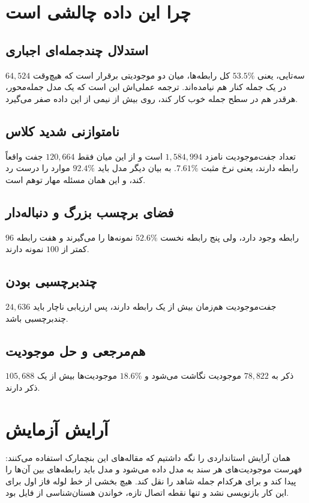 \section{چرا این داده چالشی است}
\label{sec:why-hard}

\subsection{استدلال چندجمله‌ای اجباری}
$64{,}524$ سه‌تایی، یعنی $53.5\%$ کل رابطه‌ها، میان دو موجودیتی برقرار است که هیچ‌وقت در یک جمله کنار هم نیامده‌اند. ترجمه عملی‌اش این است که یک مدل جمله‌محور، هرقدر هم در سطح جمله خوب کار کند، روی بیش از نیمی از این داده صفر می‌گیرد.

\subsection{نامتوازنی شدید کلاس}
تعداد جفت‌موجودیت نامزد $1{,}584{,}994$ است و از این میان فقط $120{,}664$ جفت واقعاً رابطه دارند، یعنی نرخ مثبت $7.61\%$. به بیان دیگر مدل باید $92.4\%$ موارد را درست رد کند، و این همان مسئله مهار توهم است.

\subsection{فضای برچسب بزرگ و دنباله‌دار}
$96$ رابطه وجود دارد، ولی پنج رابطه نخست $52.6\%$ نمونه‌ها را می‌گیرند و هفت رابطه کمتر از $100$ نمونه دارند.

\subsection{چندبرچسبی بودن}
$24{,}636$ جفت‌موجودیت هم‌زمان بیش از یک رابطه دارند، پس ارزیابی ناچار باید چندبرچسبی باشد.

\subsection{هم‌مرجعی و حل موجودیت}
$105{,}688$ ذکر به $78{,}822$ موجودیت نگاشت می‌شود و $18.6\%$ موجودیت‌ها بیش از یک ذکر دارند.

\section{آرایش آزمایش}
\label{sec:setup}

همان آرایش استانداردی را نگه داشتیم که مقاله‌های این بنچمارک استفاده می‌کنند: فهرست موجودیت‌های هر سند به مدل داده می‌شود و مدل باید رابطه‌های بین آن‌ها را پیدا کند و برای هرکدام جمله شاهد را نقل کند. هیچ بخشی از خط لوله فاز اول برای این کار بازنویسی نشد و تنها نقطه اتصال تازه، خواندن هستان‌شناسی از فایل بود.

